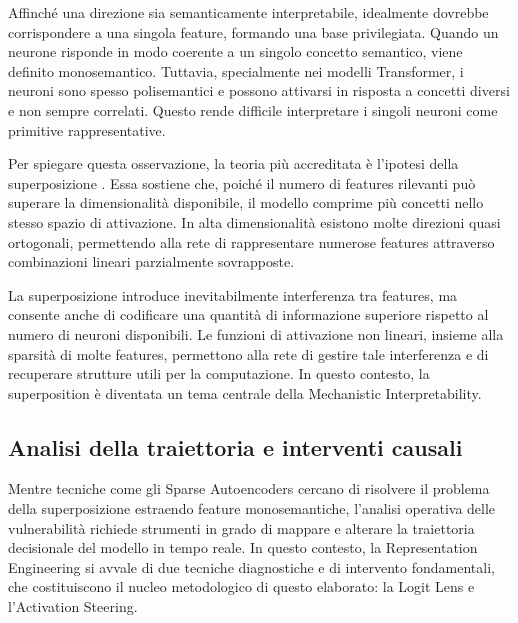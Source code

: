 Affinché una direzione sia semanticamente interpretabile, idealmente dovrebbe corrispondere a una singola feature, formando una base privilegiata. Quando un neurone risponde in modo coerente a un singolo concetto semantico, viene definito monosemantico. Tuttavia, specialmente nei modelli Transformer, i neuroni sono spesso polisemantici e possono attivarsi in risposta a concetti diversi e non sempre correlati. Questo rende difficile interpretare i singoli neuroni come primitive rappresentative.

Per spiegare questa osservazione, la teoria più accreditata è l'ipotesi della superposizione \cite{elhage2022toymodelssuperposition}. Essa sostiene che, poiché il numero di features rilevanti può superare la dimensionalità disponibile, il modello comprime più concetti nello stesso spazio di attivazione. In alta dimensionalità esistono molte direzioni quasi ortogonali, permettendo alla rete di rappresentare numerose features attraverso combinazioni lineari parzialmente sovrapposte.

La superposizione introduce inevitabilmente interferenza tra features, ma consente anche di codificare una quantità di informazione superiore rispetto al numero di neuroni disponibili. Le funzioni di attivazione non lineari, insieme alla sparsità di molte features, permettono alla rete di gestire tale interferenza e di recuperare strutture utili per la computazione. In questo contesto, la superposition è diventata un tema centrale della Mechanistic Interpretability.

\subsection{Analisi della traiettoria e interventi causali}
Mentre tecniche come gli Sparse Autoencoders cercano di risolvere il problema della superposizione estraendo feature monosemantiche, l'analisi operativa delle vulnerabilità richiede strumenti in grado di mappare e alterare la traiettoria decisionale del modello in tempo reale. In questo contesto, la Representation Engineering si avvale di due tecniche diagnostiche e di intervento fondamentali, che costituiscono il nucleo metodologico di questo elaborato: la Logit Lens e l'Activation Steering.

